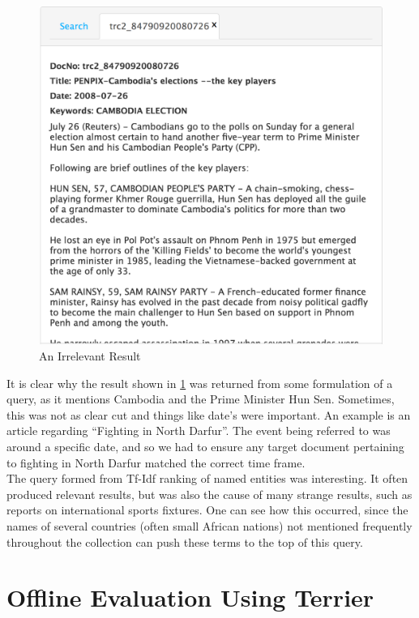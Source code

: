 \documentclass{l4proj}
\begin{document}
\begin{figure}[H]
\centering
\includegraphics[scale=0.30]{images/bad_result}
\caption{An Irrelevant Result}
\label{irrelevant_result}
\end{figure}
\bigskip

It is clear why the result shown in \ref{irrelevant_result} was returned from some formulation of a query, as it mentions Cambodia and the Prime Minister Hun Sen. Sometimes, this was not as clear cut and things like date's were important. An example is an article regarding ``Fighting in North Darfur''. The event being referred to was around a specific date, and so we had to ensure any target document pertaining to fighting in North Darfur matched the correct time frame. \\
The query formed from Tf-Idf ranking of named entities was interesting. It often produced relevant results, but was also the cause of many strange results, such as reports on international sports fixtures. One can see how this occurred, since the names of several countries (often small African nations) not mentioned frequently throughout the collection can push these terms to the top of this query.

\section{Offline Evaluation Using Terrier}\label{offlineevaluation}
\end{document}
